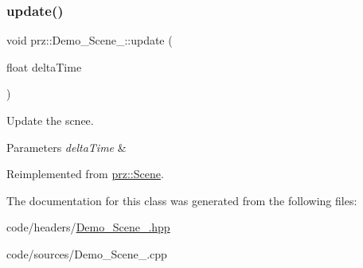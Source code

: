 \subsubsection{\texorpdfstring{update()}{update()}}
{\footnotesize\ttfamily void prz\+::\+Demo\+\_\+\+Scene\+\_\+::update (\begin{DoxyParamCaption}\item[{float}]{delta\+Time }\end{DoxyParamCaption})\hspace{0.3cm}{\ttfamily [virtual]}}



Update the scnee. 


\begin{DoxyParams}{Parameters}
{\em delta\+Time} & \\
\hline
\end{DoxyParams}


Reimplemented from \mbox{\hyperlink{classprz_1_1_scene_a19ade334f3e3ecf0cf0ace488963ef00}{prz\+::\+Scene}}.



The documentation for this class was generated from the following files\+:\begin{DoxyCompactItemize}
\item 
code/headers/\mbox{\hyperlink{_demo___scene__01_8hpp}{Demo\+\_\+\+Scene\+\_.\+hpp}}\item 
code/sources/Demo\+\_\+\+Scene\+\_.\+cpp\end{DoxyCompactItemize}
